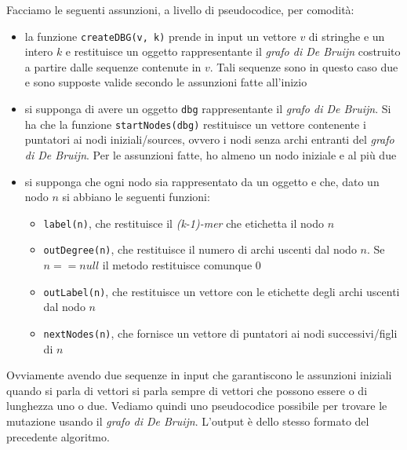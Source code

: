 \documentclass[a4paper,12pt, oneside]{book}
\begin{document}
Facciamo le seguenti assunzioni, a livello di pseudocodice, per comodità:
\begin{itemize}
  \item la funzione \texttt{createDBG(v, k)} prende in input un vettore $v$ di
  stringhe e un intero $k$ e restituisce un oggetto rappresentante il
  \textit{grafo di De Bruijn} costruito a  
  partire dalle sequenze contenute in $v$. Tali sequenze sono in questo caso due
  e sono supposte valide secondo le assunzioni fatte all'inizio
  \item si supponga di avere un oggetto \texttt{dbg} rappresentante il
  \textit{grafo di De Bruijn}. Si ha che la funzione \texttt{startNodes(dbg)}
  restituisce un vettore contenente i puntatori ai nodi iniziali/sources, ovvero
  i nodi 
  senza archi entranti del \textit{grafo di De Bruijn}. Per le assunzioni fatte,
  ho almeno un nodo iniziale e al più due
  \item si supponga che ogni nodo sia rappresentato da un oggetto e che, dato un
  nodo $n$ si abbiano le seguenti funzioni:
  \begin{itemize}
    \item \texttt{label(n)}, che restituisce il \textit{(k-1)-mer} che
    etichetta il nodo $n$
    \item \texttt{outDegree(n)}, che restituisce il numero di archi uscenti dal
    nodo $n$. Se $n==null$ il metodo restituisce comunque 0
    \item \texttt{outLabel(n)}, che restituisce un vettore con le etichette
    degli archi uscenti dal nodo $n$
    \item \texttt{nextNodes(n)}, che fornisce un vettore di puntatori ai nodi
    successivi/figli di $n$
 \end{itemize}
\end{itemize}
Ovviamente avendo due sequenze in input che garantiscono le assunzioni iniziali
quando si parla di vettori si parla sempre di vettori che possono essere o di
lunghezza uno o due.
\newpage
Vediamo quindi uno pseudocodice possibile per trovare le mutazione usando il
\textit{grafo di De Bruijn}. L'output è dello stesso formato del precedente
algoritmo. 
\end{document}
